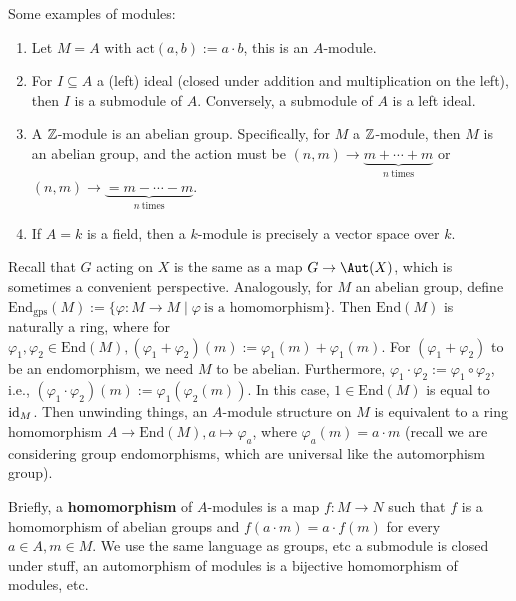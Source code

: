 \begin{example}
    Some examples of modules:
    \begin{enumerate}[label=(\arabic*)]
    \setlength\itemsep{-.2em}
        \item Let $M=A$ with $\mathrm{act}(a,b):=a\cdot b$, this is an $A$-module.
        \item For $I \subseteq A$ a (left) ideal (closed under addition and multiplication on the left), then $I$ is a submodule of $A$. Conversely, a submodule of $A$ is a left ideal.
        \item A $\mathbb{Z}$-module is an abelian group. Specifically, for $M$ a $\mathbb{Z}$-module, then $M$ is an abelian group, and the action must be $(n,m) \to \underset{n \ \text{times} }{\underbrace{m + \cdots +m}  } $ or $(n,m) \to \underset{n \ \text{times} }{\underbrace{=m - \cdots -m}  } $.
        \item If $A=k$ is a field, then a $k$-module is precisely a vector space over $k$.
    \end{enumerate}
\end{example}
Recall that $G$ acting on $X$ is the same as a map $G \to \Aut(X)$, which is sometimes a convenient perspective. Analogously, for $M$ an abelian group, define $\mathrm{End}_{\mathrm{gps}}(M) := \{\varphi  \colon M \to M \mid \varphi \ \text{is a homomorphism} \} $. Then $\mathrm{End}(M)$ is naturally a ring, where for $\varphi_1,\varphi_2 \in \mathrm{End}(M), (\varphi_1+\varphi_2)(m):= \varphi_1(m)+\varphi_1(m)$. For $(\varphi_1+\varphi_2)  $ to be an endomorphism, we need $M$ to be abelian. Furthermore, $\varphi_1\cdot \varphi_2  := \varphi_1 \circ \varphi_2$, i.e., $(\varphi_1\cdot \varphi_2)(m):= \varphi_1(\varphi_2(m))    $. In this case, $1 \in \mathrm{End}(M)$ is equal to $\operatorname{id}_M$. Then unwinding things, an $A$-module structure on $M$ is equivalent to a ring homomorphism $A \to \mathrm{End}(M), a \mapsto  \varphi_a $, where $\varphi _a(m)=a\cdot m$ (recall we are considering group endomorphisms, which are universal like the automorphism group).

Briefly, a \textbf{homomorphism} of $A$-modules is a map $f \colon M \to N$ such that $f$ is a homomorphism of abelian groups and $f(a\cdot m)=a\cdot f(m)$ for every $a \in A, m \in M$. We use the same language as groups, etc a submodule is closed under stuff, an automorphism of modules is a bijective homomorphism of modules, etc.

